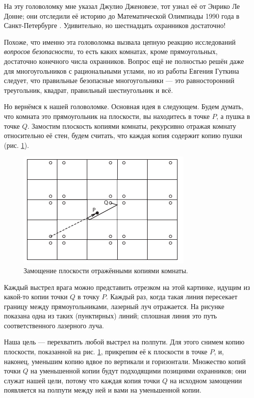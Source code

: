 На эту головоломку мне указал Джулио Дженовезе, тот узнал её от Энрико Ле Донне;
они отследили её историю до Математической Олимпиады 1990 года в Санкт-Петербурге \cite{fomin-kokhas}.
Удивительно, но шестнадцать охранников достаточно!

Похоже, что именно эта головоломка вызвала цепную реакцию исследований \emph{вопросов безопасности}, то есть каких комнатах, кроме прямоугольных, достаточно конечного числа охранников.
Вопрос ещё не полностью решён даже для многоугольников с рациональными углами, но из работы Евгения Гуткина \cite{gutkin} следует, что правильные безопасные многоугольники --- это равносторонний треугольник, квадрат, правильный шестиугольник и всё.

Но вернёмся к нашей головоломке.
Основная идея в следующем.
Будем думать, что комната это прямоугольник на плоскости, вы находитесь в точке $P$, а пушка в точке $Q$.
Замостим плоскость копиями комнаты, рекурсивно отражая комнату относительно её стен, будем считать, что каждая копия содержит копию пушки (рис. \ref{pic:room1}).

\begin{figure}[h!]
\centering
\includegraphics[scale=1]{pics/room1}
\caption{Замощение плоскости отражёнными копиями комнаты.}
\label{pic:room1}
\end{figure}

Каждый выстрел врага можно представить отрезком на этой картинке, идущим из какой-то копии точки $Q$ в точку $P$.
Каждый раз, когда такая линия пересекает границу между прямоугольниками, лазерный луч отражается.
На рисунке показана одна из таких (пунктирных) линий; сплошная линия это путь соответственного лазерного луча.

Наша цель --- перехватить любой выстрел на полпути.
Для этого снимем копию плоскости, показанной на рис. \ref{pic:room1}, прикрепим её к плоскости в точке $P$, и, наконец, уменьшим копию вдвое по вертикали и горизонтали.
Множество копий точки $Q$ на уменьшенной копии будут подходящими позициями охранников;
они служат нашей цели, потому что каждая копия точки $Q$ на исходном замощении появляется на полпути между ней и вами на уменьшенной копии.

